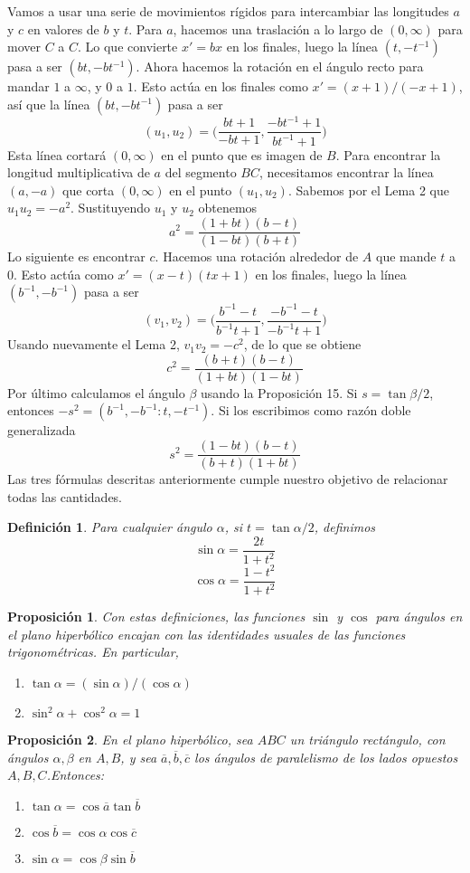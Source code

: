 \documentclass[a4paper]{amsart}
\theoremstyle{plain}
\newtheorem{definition}{Definición}
\newtheorem{proposition}{Proposición}
\begin{document}
Vamos a usar una serie de movimientos rígidos para intercambiar las longitudes $a$ y $c$ en valores de $b$ y $t$. Para $a$, hacemos una traslación a lo largo de $(0,\infty)$ para mover $C$ a $C$. Lo que convierte $x'=bx$ en los finales, luego la línea $(t,-t^{-1})$ pasa a ser $(bt,-bt^{-1})$. Ahora hacemos la rotación en el ángulo recto para mandar $1$ a $\infty$, y $0$ a $1$. Esto actúa en los finales como $x'=(x+1)/(-x+1)$, así que la línea $(bt,-bt^{-1})$ pasa a ser
\[
(u_1,u_2)=\Big( \frac{bt+1}{-bt+1},\frac{-bt^{-1}+1}{bt^{-1}+1}\Big)
\]
Esta línea cortará $(0,\infty)$ en el punto que es imagen de $B$. Para encontrar la longitud multiplicativa de $a$ del segmento $BC$, necesitamos encontrar la línea $(a,-a)$ que corta $(0,\infty)$ en el punto $(u_1,u_2)$. Sabemos por el Lema 2 que $u_1u_2=-a^2$. Sustituyendo $u_1$ y $u_2$ obtenemos
\[
a^2=\frac{(1+bt)(b-t)}{(1-bt)(b+t)}
\]
Lo siguiente es encontrar $c$. Hacemos una rotación alrededor de $A$ que mande $t$ a $0$. Esto actúa como $x'=(x-t)(tx+1)$ en los finales, luego la línea $(b^{-1},-b^{-1})$ pasa a ser
\[
(v_1,v_2)=\Big(\frac{b^{-1}-t}{b^{-1}t+1},\frac{-b^{-1}-t}{-b^{-1}t+1}\Big)
\]
Usando nuevamente el Lema 2, $v_1v_2=-c^2$, de lo que se obtiene
\[
c^2=\frac{(b+t)(b-t)}{(1+bt)(1-bt)}
\]
Por último calculamos el ángulo $\beta$ usando la Proposición 15. Si $s=\tan \beta/2$, entonces $-s^2=(b^{-1},-b^{-1}:t,-t^{-1})$. Si los escribimos como razón doble generalizada
\[
s^2=\frac{(1-bt)(b-t)}{(b+t)(1+bt)}
\]
Las tres fórmulas descritas anteriormente cumple nuestro objetivo de relacionar todas las cantidades.

\begin{definition}
Para cualquier ángulo $\alpha$, si $t=\tan\alpha /2$, definimos
\[
\sin \alpha=\frac{2t}{1+t^2}
\]
\[
\cos \alpha = \frac{1-t^2}{1+t^2}
\]
\end{definition}

\begin{proposition}
Con estas definiciones, las funciones $\sin$ y $\cos$ para ángulos en el plano hiperbólico encajan con las identidades usuales de las funciones trigonométricas. En particular,
\begin{enumerate}
\item [(a)] $\tan\alpha=(\sin\alpha)/(\cos\alpha)$
\item [(b)] $\sin^2\alpha + \cos^2 \alpha=1$
\end{enumerate}
\end{proposition}

\begin{proposition}
En el plano hiperbólico, sea $ABC$ un triángulo rectángulo, con ángulos $\alpha,\beta$ en $A,B$, y sea $\overline{a},\overline{b},\overline{c}$ los ángulos de paralelismo de los lados opuestos $A, B, C$.Entonces:
\begin{enumerate}
\item [(a)] $\tan \alpha = \cos \overline{a}\tan \overline{b}$
\item [(b)] $\cos \overline{b}=\cos\alpha\cos \overline{c}$
\item [(c)] $\sin \alpha =\cos \beta \sin \overline{b}$
\end{enumerate}
\end{proposition}
\end{document}
